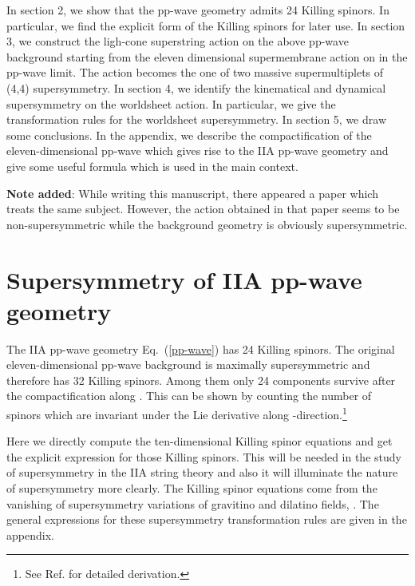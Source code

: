 \documentclass[a4paper,12pt]{article}
\begin{document}
In section 2, we show that the pp-wave geometry admits 24 Killing
spinors.  In particular, we find the explicit form of the Killing
spinors for later use.  In section 3, we construct the ligh-cone
superstring action on the above pp-wave background starting from the
eleven dimensional supermembrane action on \coordHE{} in the
pp-wave limit.  The action becomes the one of two massive
supermultiplets of (4,4) supersymmetry.  In section 4, we identify the
kinematical and dynamical supersymmetry on the worldsheet action.  In
particular, we give the transformation rules for the \coordHE{}
worldsheet supersymmetry.  In section 5, we draw some conclusions. In
the appendix, we describe the compactification of the
eleven-dimensional pp-wave which gives rise to the IIA pp-wave
geometry and give some useful formula which is used in the main
context.
 
{\bf Note added}: While writing this manuscript, there appeared a
paper \cite{sug029} which treats the same subject. However, the action
obtained in that paper seems to be non-supersymmetric while the
background geometry is obviously supersymmetric.





\section{Supersymmetry of IIA pp-wave geometry}

The IIA pp-wave geometry Eq.~(\ref{pp-wave}) has 24 Killing spinors.
The original eleven-dimensional pp-wave background is maximally
supersymmetric and therefore has 32 Killing spinors.  Among them only
24 components survive after the compactification along \coordHE{}. This can
be shown by counting the number of spinors which are invariant under
the Lie derivative along \coordHE{}-direction.\footnote{See
Ref. \cite{mic140} for detailed derivation.}

Here we directly compute the ten-dimensional Killing spinor equations
and get the explicit expression for those Killing spinors. This will
be needed in the study of supersymmetry in the IIA string theory and
also it will illuminate the nature of supersymmetry more clearly.  The
Killing spinor equations come from the vanishing of supersymmetry
variations of gravitino and dilatino fields,
\coordHE{}. The general expressions for these
supersymmetry transformation rules are given in the appendix.
\end{document}
